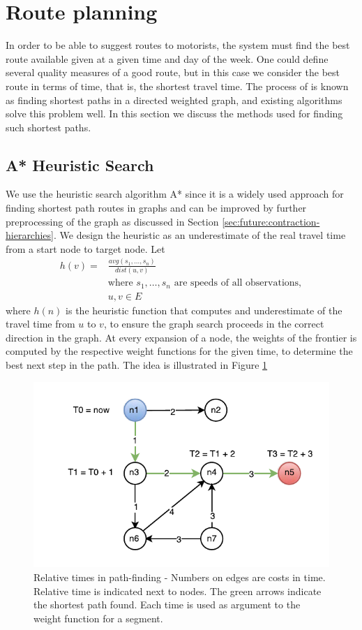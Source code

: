 \section{Route planning}
In order to be able to suggest routes to motorists, the system must find the best route available given at a given time and day of the week. One could define several quality measures of a good route, but in this case we consider the best route in terms of time, that is, the shortest travel time. The process of is known as finding shortest paths in a directed weighted graph, and existing algorithms solve this problem well. In this section we discuss the methods used for finding such shortest paths.

\subsection{A* Heuristic Search}\label{sec:pathfinding}
We use the heuristic search algorithm A* since it is a widely used approach for finding shortest path routes in graphs and can be improved by further preprocessing of the graph as discussed in Section \ref{sec:future:contraction-hierarchies}.
We design the heuristic as an underestimate of the real travel time from a start node to target node. Let 
\begin{align*}
h(v) = &\frac{avg(s_1,…,s_n)}{dist(u,v)} \\
&\text{where } s_1,…,s_n \text{ are speeds of all observations},\\
&u,v \in E
\end{align*}
where $h(n)$ is the heuristic function that computes and underestimate of the travel time from $u$ to $v$, to ensure the graph search proceeds in the correct direction in the graph.
At every expansion of a node, the weights of the frontier is computed by the respective weight functions for the given time, to determine the best next step in the path. The idea is illustrated in Figure \ref{fig:timed-graph} 
\begin{figure}[h]
\centering
\includegraphics[width=\linewidth]{figures/timed-graph}
\caption{Relative times in path-finding - Numbers on edges are costs in time. Relative time is indicated next to nodes. The green arrows indicate the shortest path found. Each time is used as argument to the weight function for a segment.}
\label{fig:timed-graph}
\end{figure}

